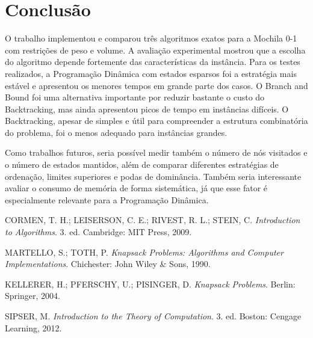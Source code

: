 \documentclass[
    12pt,
    oneside,
    a4paper,
    brazil,
    article
]{abntex2}
\begin{document}
\section{Conclusão}

O trabalho implementou e comparou três algoritmos exatos para a Mochila 0-1 com restrições de peso e volume. A avaliação experimental mostrou que a escolha do algoritmo depende fortemente das características da instância. Para os testes realizados, a Programação Dinâmica com estados esparsos foi a estratégia mais estável e apresentou os menores tempos em grande parte dos casos. O Branch and Bound foi uma alternativa importante por reduzir bastante o custo do Backtracking, mas ainda apresentou picos de tempo em instâncias difíceis. O Backtracking, apesar de simples e útil para compreender a estrutura combinatória do problema, foi o menos adequado para instâncias grandes.

Como trabalhos futuros, seria possível medir também o número de nós visitados e o número de estados mantidos, além de comparar diferentes estratégias de ordenação, limites superiores e podas de dominância. Também seria interessante avaliar o consumo de memória de forma sistemática, já que esse fator é especialmente relevante para a Programação Dinâmica.

\begin{referencias}

CORMEN, T. H.; LEISERSON, C. E.; RIVEST, R. L.; STEIN, C. \textit{Introduction to Algorithms}. 3. ed. Cambridge: MIT Press, 2009.

MARTELLO, S.; TOTH, P. \textit{Knapsack Problems: Algorithms and Computer Implementations}. Chichester: John Wiley \& Sons, 1990.

KELLERER, H.; PFERSCHY, U.; PISINGER, D. \textit{Knapsack Problems}. Berlin: Springer, 2004.

SIPSER, M. \textit{Introduction to the Theory of Computation}. 3. ed. Boston: Cengage Learning, 2012.

\end{referencias}
\end{document}
